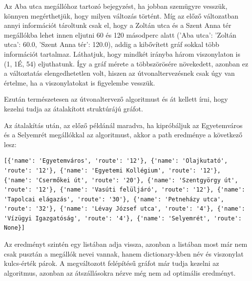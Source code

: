 Az Aba utca megállóhoz tartozó bejegyzést, ha jobban szemügyre vesszük, könnyen megérthetjük, hogy milyen változás történt. Míg az előző változatban annyi információt tároltunk csak el, hogy a Zoltán utca és a Szent Anna tér megállókba lehet innen eljutni 60 és 120 másodperc alatt ('Aba utca': {'Zoltán utca': 60.0, 'Szent Anna tér': 120.0}), addig a kibővített gráf sokkal több információt tartalmaz. Láthatjuk, hogy mindkét irányba három viszonylaton is (1, 1É, 54) eljuthatunk. Így a gráf mérete a többszörösére növekedett, azonban ez a változtatás elengedhetetlen volt, hiszen az útvonaltervezésnek csak úgy van értelme, ha a viszonylatokat is figyelembe vesszük.

Ezután természetesen az útvonaltervező algoritmust és át kellett írni, hogy kezelni tudja az átalakított struktúrájú gráfot.

Az átalakítás után, az előző példánál maradva, ha kipróbáljuk az Egyetemváros és a Selyemrét megállókkal az algoritmust, akkor a path eredménye a következő lesz:

\begin{verbatim}
[{'name': 'Egyetemváros', 'route': '12'}, {'name': 'Olajkutató', 'route': '12'}, {'name': 'Egyetemi Kollégium', 'route': '12'}, {'name': 'Csermőkei út', 'route': '20'}, {'name': 'Szentgyörgy út', 'route': '12'}, {'name': 'Vasúti felüljáró', 'route': '12'}, {'name': 'Tapolcai elágazás', 'route': '30'}, {'name': 'Petneházy utca', 'route': '32'}, {'name': 'Lévay József utca', 'route': '4'}, {'name': 'Vízügyi Igazgatóság', 'route': '4'}, {'name': 'Selyemrét', 'route': None}]
\end{verbatim}

Az eredményt szintén egy listában adja vissza, azonban a listában most már nem csak pusztán a megállók nevei vannak, hanem dictionary-kben név és viszonylat kulcs-érték párok. A megváltozott felépítésű gráfot már tudja kezelni az algoritmus, azonban az átszállásokra nézve még nem ad optimális eredményt.

